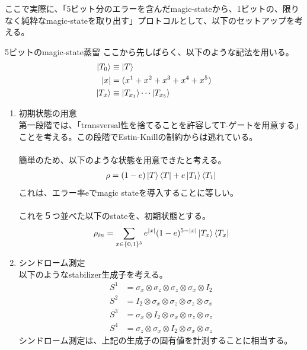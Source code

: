 \documentclass[a4paper,10.5pt]{article}
\numberwithin{equation}{section}
\begin{document}
ここで実際に、「5ビット分のエラーを含んだmagic-stateから、1ビットの、限りなく純粋なmagic-stateを取り出す」プロトコルとして、以下のセットアップを考える。
\begin{setupbox}{5ビットのmagic-state蒸留}
 ここから先しばらく、以下のような記法を用いる。
 \begin{align*}
     \ket{T_{0}}&\equiv  \ket{T}\\
     |x|&=(x^{1}+x^{2}+x^{3}+x^{4}+x^{5})\\
     \ket{T_{x}}&\equiv  \ket{T_{x_{1}}}\cdots\ket{T_{x_{5}}}
 \end{align*}
    \begin{enumerate}
        \item 初期状態の用意\\
        第一段階では、「transversal性を捨てることを許容してT-ゲートを用意する」ことを考える。この段階でEstin-Knillの制約からは逃れている。\\       \\
        簡単のため、以下のような状態を用意できたと考える。
        \begin{align*}
            \rho=(1-e)\ket{T}\bra{T}+e\ket{T_{1}}\bra{T_{1}}
        \end{align*}
        これは、エラー率eでmagic stateを導入することに等しい。\\
        \\
        これを５つ並べた以下のstateを、初期状態とする。
        \begin{align*}
            \rho_{in}=\sum_{x\in \{0,1\}^{5}}e^{|x|}(1-e)^{5-|x|}\ket{T_{x}}\bra{T_{x}}
        \end{align*}
        \item シンドローム測定\\
        以下のようなstabilizer生成子を考える。
        \begin{align*}
            S^{1}&=\sigma_{x}\otimes \sigma_{z}\otimes\sigma_{z}\otimes \sigma_{x}\otimes I_{2}\\
            S^{2}&=I_{2}\otimes\sigma_{x}\otimes \sigma_{z}\otimes\sigma_{z}\otimes \sigma_{x}\\
            S^{3}&=\sigma_{x}\otimes I_{2}\otimes\sigma_{x}\otimes \sigma_{z}\otimes\sigma_{z}\\
            S^{4}&=\sigma_{z}\otimes \sigma_{x}\otimes I_{2}\otimes\sigma_{x}\otimes \sigma_{z}
        \end{align*}
        シンドローム測定は、上記の生成子の固有値を計測することに相当する。
        \\

\end{enumerate}
\end{setupbox}
\end{document}
